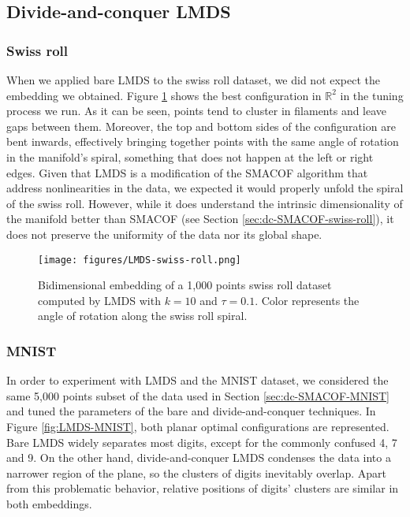 \subsection{Divide-and-conquer LMDS}
\label{sec:dc-LMDS}

\subsubsection{Swiss roll}

When we applied bare LMDS to the swiss roll dataset, we did not expect the embedding we obtained. Figure \ref{fig:LMDS-swiss-roll} shows the best configuration in $\mathbb{R}^2$ in the tuning process we run. As it can be seen, points tend to cluster in filaments and leave gaps between them. Moreover, the top and bottom sides of the configuration are bent inwards, effectively bringing together points with the same angle of rotation in the manifold's spiral, something that does not happen at the left or right edges. Given that LMDS is a modification of the SMACOF algorithm that address nonlinearities in the data, we expected it would properly unfold the spiral of the swiss roll. However, while it does understand the intrinsic dimensionality of the manifold better than SMACOF (see Section \ref{sec:dc-SMACOF-swiss-roll}), it does not preserve the uniformity of the data nor its global shape.

\begin{figure}
    \centering
    \texttt{[image: figures/LMDS-swiss-roll.png]}
    \caption{Bidimensional embedding of a 1,000 points swiss roll dataset computed by LMDS with $k=10$ and $\tau = 0.1$. Color represents the angle of rotation along the swiss roll spiral.}
    \label{fig:LMDS-swiss-roll}
\end{figure}

\subsubsection{MNIST}

In order to experiment with LMDS and the MNIST dataset, we considered the same 5,000 points subset of the data used in Section \ref{sec:dc-SMACOF-MNIST} and tuned the parameters of the bare and divide-and-conquer techniques. In Figure \ref{fig:LMDS-MNIST}, both planar optimal configurations are represented. Bare LMDS widely separates most digits, except for the commonly confused 4, 7 and 9. On the other hand, divide-and-conquer LMDS condenses the data into a narrower region of the plane, so the clusters of digits inevitably overlap. Apart from this problematic behavior, relative positions of digits' clusters are similar in both embeddings.

